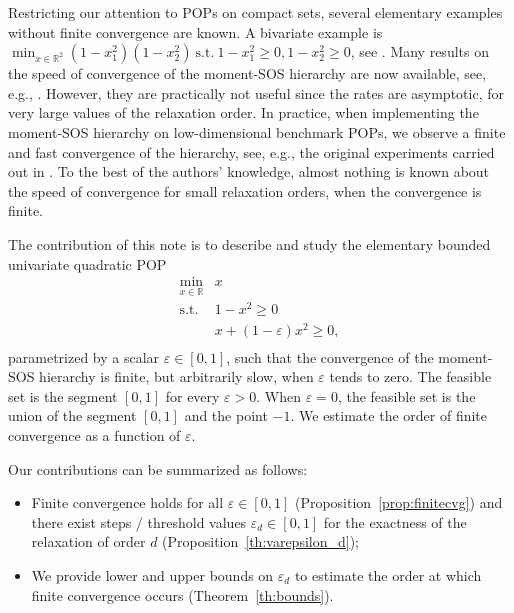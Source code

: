 \documentclass[a4paper,12pt]{article}
\newcommand{\R}{\mathbb{R}} %
\begin{document}
Restricting our attention to POPs on compact sets,
several elementary examples without finite convergence are known. 
%
%
A bivariate example is $\min_{x \in \R^2} (1-x^2_1)(1-x^2_2) \:\mathrm{s.t.}\: 1-x^2_1\geq 0, 1-x^2_2 \geq 0$, see \cite[Prop. 29]{bs23}. Many results on the speed of convergence of the moment-SOS hierarchy are now available, see, e.g., \cite{b22,s22}. However, they are practically not useful since the rates are asymptotic, for very large values of the relaxation order. In practice, when implementing the moment-SOS hierarchy on low-dimensional benchmark POPs, we observe a finite and fast convergence of the hierarchy, see, e.g., the original experiments carried out in \cite{hl03}. To the best of the authors' knowledge, almost nothing is known about the speed of convergence for small relaxation orders, when the convergence is finite.

The contribution of this note is to describe and study the elementary bounded univariate quadratic POP
\[
\begin{array}{rl}
\min_{x \in \R} & x \\
\mathrm{s.t.} &1-x^2 \geq 0 \\
 & x+(1-\varepsilon)x^2 \geq 0 ,\\
\end{array}
\]
parametrized by a scalar $\varepsilon \in [0,1]$, such that the convergence of the moment-SOS hierarchy is finite, but arbitrarily slow, when $\varepsilon$ tends to zero. 
{The feasible set is the segment $[0, 1]$ for every $\varepsilon > 0$. When $\varepsilon=0$, the feasible set is the union of the segment $[0,1]$ and the point $-1$.}
We estimate the order of finite convergence as a function of $\varepsilon$. 

Our contributions can be summarized as follows:
\begin{itemize}

\item Finite convergence holds for all $\varepsilon \in [0, 1]$ %
({Proposition}~\ref{prop:finitecvg}) and there exist steps / threshold values $\varepsilon_d \in [0,1]$
    for the exactness of the relaxation of order $d$
    ({Proposition}~\ref{th:varepsilon_d});

\item %
We provide lower and upper bounds on $\varepsilon_d$ to estimate the order at which finite convergence occurs (Theorem~\ref{th:bounds}).

\end{itemize}
\end{document}
